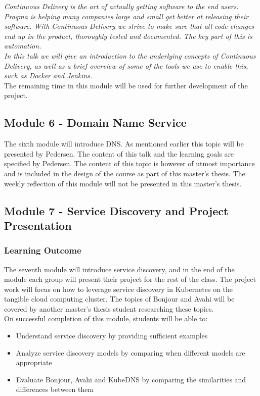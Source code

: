 \noindent\textit{Continuous Delivery is the art of actually getting software to the end users.} \\

\noindent\textit{Praqma is helping many companies large and small get better at releasing their software. With Continuous Delivery we strive to make sure that all code changes end up in the product, thoroughly tested and documented. The key part of this is automation.} \\ 

\noindent\textit{In this talk we will give an introduction to the underlying concepts of Continuous Delivery, as well as a brief overview of some of the tools we use to enable this, such as Docker and Jenkins.} \\

\noindent The remaining time in this module will be used for further development of the project.


\subsection*{Module 6 - Domain Name Service}
The sixth module will introduce DNS. As mentioned earlier this topic will be presented by Pedersen. The content of this talk and the learning goals are specified by Pedersen. The content of this topic is however of utmost importance and is included in the design of the course as part of this master's thesis. The weekly reflection of this module will not be presented in this master's thesis.

\subsection*{Module 7 - Service Discovery and Project Presentation}
\subsubsection*{Learning Outcome}
The seventh module will introduce service discovery, and in the end of the module each group will present their project for the rest of the class. The project work will focus on how to leverage service discovery in Kubernetes on the tangible cloud computing cluster. The topics of Bonjour and Avahi will be covered by another master's thesis student researching these topics.\\ 

\noindent
On successful completion of this module, students will be able to:
\begin{itemize}
    \item Understand service discovery by providing sufficient examples
    \item Analyze service discovery models by comparing when different models are appropriate
    \item Evaluate Bonjour, Avahi and KubeDNS by comparing the similarities and differences between them
\end{itemize}

